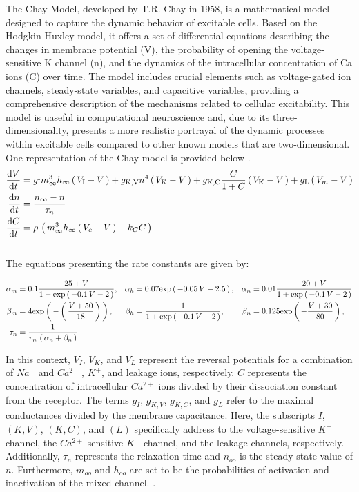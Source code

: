 \documentclass[class={myRUCProject}, crop=false]{standalone}
\begin{document}
The Chay Model, developed by T.R. Chay in 1958, is a mathematical model designed to capture the dynamic behavior of excitable cells. Based on the Hodgkin-Huxley model, it offers a set of differential equations describing the changes in membrane potential (V), the probability of opening the voltage-sensitive \gls{K} channel (n), and the dynamics of the intracellular concentration of \gls{Ca} ions (C) over time. The model includes crucial elements such as voltage-gated ion channels, steady-state variables, and capacitive variables, providing a comprehensive description of the mechanisms related to cellular excitability. This model is uaseful in computational neuroscience and, due to its three-dimensionality, presents a more realistic portrayal of the dynamic processes within excitable cells compared to other known models that are two-dimensional. One representation of the Chay model is provided below \cite{Chay1985}. \\
\begin{align}
    \frac{\mathrm{d}\displaystyle V}{\mathrm{d}\displaystyle t} &= g_\mathrm{I}  m^3_\infty h_\infty \left(\,V_\mathrm{I} - V\,\right) + g_\mathrm{K, V} n^4 \left(\,V_\mathrm{K} - V\,\right) + g_\mathrm{K, C}  \frac{C}{1+C}\left(\,V_\mathrm{K} - V\,\right) + g_\mathrm{L} \left(\,V_m - V\,\right) \\
    \frac{\mathrm{d}\displaystyle n}{\mathrm{d}\displaystyle t} &= \frac{n_\infty - n}{\tau_n} \\
    \frac{\mathrm{d}\displaystyle C}{\mathrm{d}\displaystyle t} &= \rho \, \left(\,m^3_\infty h_\infty \left(\,V_c - V\,\right) - k_C C\,\right)
\end{align}\\

The equations presenting the rate constants are given by:

\begin{align*}
    \alpha_m &= 0.1 \frac{25 + V}{1 - \mathrm{exp}\left(\,-0.1 \, V - 2\,\right)}, &
    \alpha_h &=  0.07 \mathrm{exp}\left(\,-0.05\,V -2.5\,\right), &
    \alpha_n &= 0.01 \frac{20 + V}{1 + \mathrm{exp}\left(\,-0.1 \, V - 2\,\right)} \\
    \beta_m  &= 4 \mathrm{exp}\left(\,-\left(\,\frac{ V + 50 }{ 18 } \,\right) \,\right), &
    \beta_h  &= \frac{ 1 }{ 1 + \mathrm{exp}\left(\,-0.1 \, V - 2\,\right)}, &
    \beta_n  &= 0.125 \mathrm{exp}\left(\,- \frac{V + 30}{80}\,\right), \\
    \tau_n &= \frac{1}{ r_n \, \left(\,\alpha_n + \beta_n\,\right) }
\end{align*} 

In this context, $V_I$, $V_K$, and $V_L$ represent the reversal potentials for a combination of $Na^+$ and $Ca^{2+}$, $K^+$, and leakage ions, respectively. $C$ represents the concentration of intracellular $Ca^{2+}$ ions divided by their dissociation constant from the receptor. The terms $g_I$, $g_{K,V}$, $g_{K,C}$, and $g_L$ refer to the maximal conductances divided by the membrane capacitance. Here, the subscripts $I$, $(K,V)$, $(K,C)$, and $(L)$ specifically address to the voltage-sensitive $K^+$ channel, the $Ca^{2+}$-sensitive $K^+$ channel, and the leakage channels, respectively. Additionally, $\tau_n$ represents the relaxation time and $n_{oo}$ is the steady-state value of $n$. Furthermore, $m_{oo}$ and $h_{oo}$ are set to  be the probabilities of activation and inactivation of the mixed channel. \cite{Chay1985}.
\end{document}
